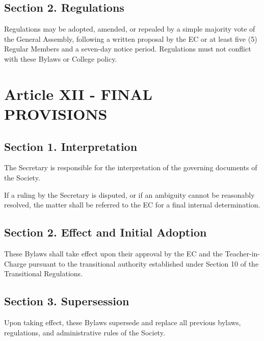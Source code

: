 \documentclass[a4paper]{article}
\begin{document}
\subsection*{Section 2. Regulations}

Regulations may be adopted, amended, or repealed by a simple majority vote of the General Assembly, following a written proposal by the EC or at least five (5) Regular Members and a seven-day notice period. Regulations must not conflict with these Bylaws or College policy.

\section*{Article XII - FINAL PROVISIONS}

\subsection*{Section 1. Interpretation}

The Secretary is responsible for the interpretation of the governing documents of the Society.

If a ruling by the Secretary is disputed, or if an ambiguity cannot be reasonably resolved, the matter shall be referred to the EC for a final internal determination.

\subsection*{Section 2. Effect and Initial Adoption}

These Bylaws shall take effect upon their approval by the EC and the Teacher-in-Charge pursuant to the transitional authority
established under Section 10 of the Transitional Regulations.

\subsection*{Section 3. Supersession}
Upon taking effect, these Bylaws supersede and replace all previous bylaws, regulations, and administrative rules of the Society.
\end{document}

